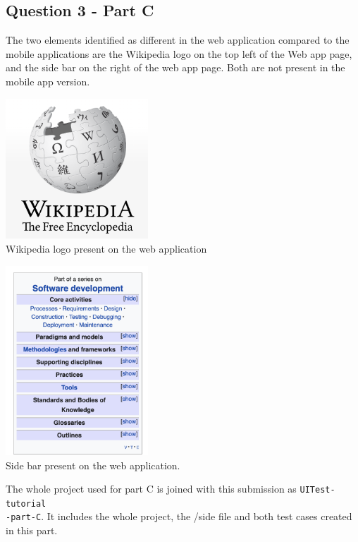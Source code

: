 \subsection*{Question 3 - Part C}

\noindent The two elements identified as different in the web application compared to the mobile applications are the Wikipedia logo on the top left of the Web app page, and the side bar on the right of the web app page. Both are not present in the mobile app version.

\begin{center}
        \includegraphics[width=0.4\textwidth]{img/partC2.png}
        \noindent  \\Wikipedia logo present on the web application
\end{center}
\begin{center}
        \includegraphics[width=0.4\textwidth]{img/partC1.png}
        \noindent  \\Side bar present on the web application.
\end{center}

\noindent The whole project used for part C is joined with this submission as \verb|UITest-tutorial|\\\verb|-part-C|. It includes the whole project, the /side file and both test cases created in this part. 